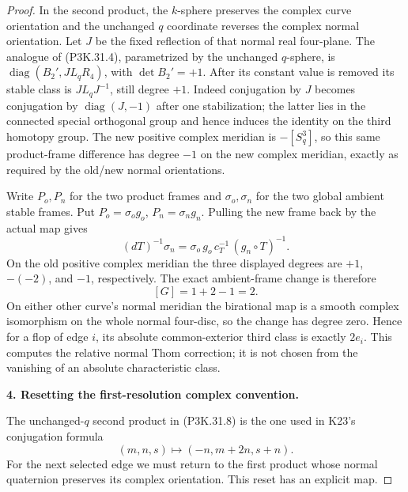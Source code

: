 \begin{proof}
In the second product, the \(k\)-sphere preserves the
complex curve orientation and the unchanged \(q\)
coordinate reverses the complex normal orientation.
Let \(J\) be the fixed reflection of that normal real
four-plane. The analogue of (P3K.31.4), parametrized by
the unchanged \(q\)-sphere, is
\(\operatorname{diag}(B_2',J L_qR_4)\), with
\(\det B_2'=+1\).
After its constant value is removed its stable class
is \(J L_qJ^{-1}\), still degree \(+1\).
Indeed conjugation by \(J\) becomes conjugation by
\(\operatorname{diag}(J,-1)\) after one stabilization;
the latter lies in the connected special orthogonal
group and hence induces the identity on the third
homotopy group. The new positive complex meridian is
\(-[S^3_q]\), so this same product-frame difference has
degree \(-1\) on the new complex meridian, exactly as
required by the old/new normal orientations.

Write \(P_o,P_n\) for the two product frames and
\(\sigma_o,\sigma_n\) for the two global ambient stable
frames. Put \(P_o=\sigma_og_o\), \(P_n=\sigma_ng_n\).
Pulling the new frame back by the actual map gives
\[
 (dT)^{-1}\sigma_n
       =\sigma_o\,g_o\,c_T^{-1}\,(g_n\circ T)^{-1}.
                                                        \tag{P3K.31.10}
\]
On the old positive complex meridian the three displayed
degrees are \(+1\), \(-(-2)\), and \(-1\), respectively.
The exact ambient-frame change is therefore
\[
                         [G]=1+2-1=2.
                                                        \tag{P3K.31.11}
\]
On either other curve's normal meridian the birational
map is a smooth complex isomorphism on the whole normal
four-disc, so the change has degree zero. Hence for a
flop of edge \(i\), its absolute common-exterior third
class is exactly \(2e_i\). This computes the relative
normal Thom correction; it is not chosen from the
vanishing of an absolute characteristic class.

\par\medskip\noindent\textbf{4. Resetting the first-resolution complex convention.}\enspace

The unchanged-\(q\) second product in (P3K.31.8) is the one
used in K23's conjugation formula
\[
             (m,n,s)\longmapsto(-n,m+2n,s+n).
                                                        \tag{P3K.31.12}
\]
For the next selected edge we must return to the first
product whose normal quaternion preserves its complex
orientation. This reset has an explicit map.


\end{proof}
